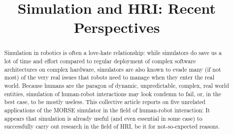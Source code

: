 \documentclass[conference]{IEEEtran}
\begin{document}
\title{Simulation and HRI: Recent Perspectives}

\author{}


\maketitle

\begin{abstract}

Simulation in robotics is often a love-hate relationship: while simulators do
save us a lot of time and effort compared to regular deployment of complex
software architectures on complex hardware, simulators are also known to evade
many (if not most) of the very real issues that robots need to manage when they
enter the real world.  Because humans are the paragon of dynamic, unpredictable,
complex, real world entities, simulation of human-robot interactions may look
condemn to fail, or, in the best case, to be mostly useless.  This collective
article reports on five unrelated applications of the MORSE simulator in the
field of human-robot interaction: It appears that simulation is already useful
(and even essential in some case) to successfully carry out research in the
field of HRI, be it for not-so-expected reasons.

\end{abstract}
\end{document}
